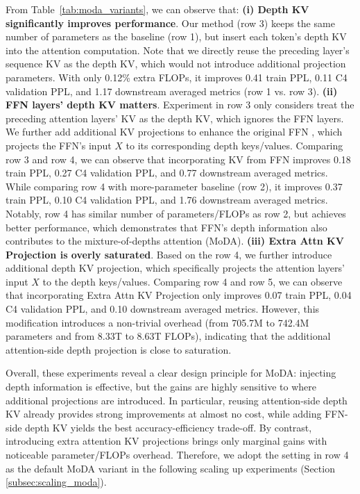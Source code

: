 \documentclass[]{bytedance_seed}
\newcommand{\name}{MoDA}
\begin{document}
From Table~\ref{tab:moda_variants}, we can observe that: 
\textbf{(i) Depth KV significantly improves performance}. 
Our method (row 3) keeps the same number of parameters as the baseline (row 1), but insert each token's depth KV into the attention computation.
Note that we directly reuse the preceding layer's sequence KV as the depth KV, which would not introduce additional projection parameters.
With only 0.12\% extra FLOPs, it improves 0.41 train PPL, 0.11 C4 validation PPL, and 1.17 downstream averaged metrics (row 1 vs. row 3).
\textbf{(ii) FFN layers' depth KV matters}.
Experiment in row 3 only considers treat the preceding attention layers' KV as the depth KV, which ignores the FFN layers.
We further add additional KV projections to enhance the original FFN , which projects the FFN's input $X$ to its corresponding depth keys/values.
Comparing row 3 and row 4, we can observe that incorporating KV from FFN improves 0.18 train PPL, 0.27 C4 validation PPL, and 0.77 downstream averaged metrics.
While comparing row 4 with more-parameter baseline (row 2), it improves 0.37 train PPL, 0.10 C4 validation PPL, and 1.76 downstream averaged metrics.
Notably, row 4 has similar number of parameters/FLOPs as row 2, but achieves better performance, which demonstrates that FFN's depth information also contributes to the mixture-of-depths attention (\name).
\textbf{(iii) Extra Attn KV Projection is overly saturated}.
Based on the row 4, we further introduce additional depth KV projection, which specifically projects the attention layers' input $X$ to the depth keys/values.
Comparing row 4 and row 5, we can observe that incorporating Extra Attn KV Projection only improves 0.07 train PPL, 0.04 C4 validation PPL, and 0.10 downstream averaged metrics.
However, this modification introduces a non-trivial overhead (from 705.7M to 742.4M parameters and from 8.33T to 8.63T FLOPs), indicating that the additional attention-side depth projection is close to saturation.

Overall, these experiments reveal a clear design principle for \name{}: injecting depth information is effective, but the gains are highly sensitive to where additional projections are introduced.
In particular, reusing attention-side depth KV already provides strong improvements at almost no cost, while adding FFN-side depth KV yields the best accuracy-efficiency trade-off.
By contrast, introducing extra attention KV projections brings only marginal gains with noticeable parameter/FLOPs overhead.
Therefore, we adopt the setting in row 4 as the default \name{} variant in the following scaling up experiments (Section \ref{subsec:scaling_moda}).
\end{document}
